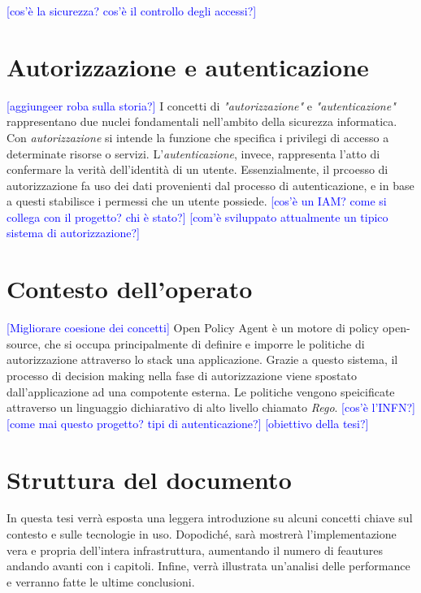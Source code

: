 \textcolor{blue}{[cos'è la sicurezza? cos'è il controllo degli accessi?]}

\section{Autorizzazione e autenticazione}
\textcolor{blue}{[aggiungeer roba sulla storia?]}
I concetti di \textit{"autorizzazione"} e \textit{"autenticazione"} rappresentano due nuclei fondamentali nell'ambito 
della sicurezza informatica. Con \textit{autorizzazione} si intende la funzione che specifica i privilegi di accesso a determinate risorse o servizi. 
L'\textit{autenticazione}, invece, rappresenta l'atto di confermare la verità dell'identità di un utente.
Essenzialmente, il prcoesso di autorizzazione fa uso dei dati provenienti dal processo di autenticazione, e in base a questi stabilisce i 
permessi che un utente possiede.
\textcolor{blue}{[cos'è un IAM? come si collega con il progetto? chi è stato?]}
\textcolor{blue}{[com'è sviluppato attualmente un tipico sistema di autorizzazione?]}

\section{Contesto dell'operato}
\textcolor{blue}{[Migliorare coesione dei concetti]}
Open Policy Agent è un motore di policy open-source, che si occupa principalmente di definire e imporre le politiche di autorizzazione attraverso lo stack una applicazione.
Grazie a questo sistema, il processo di decision making nella fase di autorizzazione viene spostato dall'applicazione ad una compotente esterna. 
\newline
Le politiche vengono speicificate attraverso un linguaggio dichiarativo di alto livello chiamato \textit{Rego}.
\textcolor{blue}{[cos'è l'INFN?]}
\textcolor{blue}{[come mai questo progetto? tipi di autenticazione?]}
\textcolor{blue}{[obiettivo della tesi?]}

\section{Struttura del documento}
In questa tesi verrà esposta una leggera introduzione su alcuni concetti chiave sul contesto e sulle tecnologie in uso. 
Dopodiché, sarà mostrerà l'implementazione vera e propria dell'intera infrastruttura, aumentando il numero di feautures andando avanti
con i capitoli. Infine, verrà illustrata un'analisi delle performance e verranno fatte le ultime conclusioni.  
